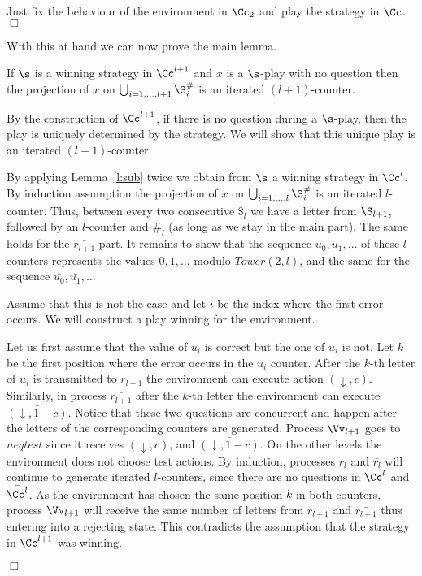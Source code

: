 \documentclass{llncs}
\newcommand{\eqtest}{\downarrow}
\newcommand{\Tower}{\mathit{Tower}}
\renewenvironment{proof}{{\em Proof. }}{\nopagebreak
  \hspace*{\fill}$\Box$}
\begin{document}
\medskip

\begin{proof}
  Just fix the behaviour of the environment in $\Cc_2$ and play the
  strategy in $\Cc$.
\end{proof}

With this at hand we can now prove the main lemma.

\medskip

\begin{lemma}\label{lemma:strategy-long}
  If $\s$ is a winning strategy in $\Cc^{l+1}$ and $x$ is a
  $\s$-play with no question then the projection of $x$ on
  $\bigcup_{i=1, \ldots,l+1}\S^\#_i$ is an iterated $(l+1)$-counter.
\end{lemma}

\medskip

\begin{proof}
  By the construction of $\Cc^{l+1}$, if
  there is no question during a $\s$-play, then the play is uniquely
  determined by the strategy. We will show that this unique play is an
  iterated $(l+1)$-counter. 

  By applying Lemma~\ref{l:sub} twice we obtain from $\s$
  a winning strategy in
  $\Cc^l$. By induction assumption the projection of $x$ on
  $\bigcup_{i=1, \ldots,l} \S^\#_i$  is an iterated
  $l$-counter. 
  Thus, between every two  consecutive
  $\$_l$ we have a letter from $\S_{l+1}$, followed by an $l$-counter and
  $\#_l$ (as long as we stay in the main part). The same
  holds for the $\bar{r_{l+1}}$ part. It remains to
  show that the sequence $u_0,u_1,\ldots$ of these $l$-counters 
  represents the values $0,1,\ldots$ modulo $\Tower(2,l)$, and the same
  for the sequence $\bar{u_0},\bar{u_1},\ldots$

  Assume that this is not the case and let $i$ be the index where the
  first error occurs. We will construct a play winning for the
  environment. 

  Let us first assume that the value of $\bar{u_i}$ is correct but the
  one of $u_i$ is not. Let $k$ be the first position where the error
  occurs in the $u_i$ counter. After the $k$-th letter of $u_i$ is
  transmitted to $r_{l+1}$ the environment can execute action
  $(\eqtest,c)$. Similarly, in process $\bar{r_{l+1}}$ after the
  $k$-th letter the environment can execute
  $\bar{(\eqtest,1-c)}$. Notice that these two questions are
  concurrent and happen after the letters of the corresponding
  counters are generated. Process $\Vv_{l+1}$ goes
  to $\mathit{neqtest}$ since it receives $(\eqtest,c)$, and
  $\bar{(\eqtest,1-c)}$. On the other levels the environment does not
  choose test actions. By induction, processes $r_l$ and $\bar{r_l}$
  will continue to generate iterated $l$-counters, since there are no
  questions in $\Cc^l$ and $\bar{\Cc^l}$.  As the environment
  has chosen the same position $k$ in both counters, process $\Vv_{l+1}$ will
  receive the same number of letters from $r_{l+1}$ and
  $\bar{r_{l+1}}$ thus entering into a rejecting state. This
  contradicts the assumption that the strategy in $\Cc^{l+1}$ was
  winning.


\end{proof}
\end{document}
